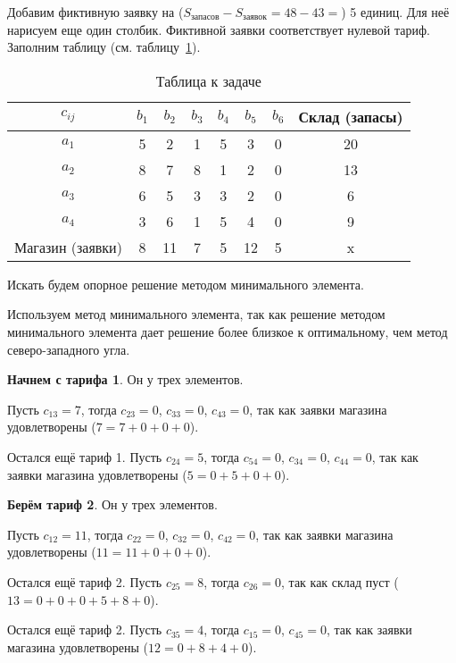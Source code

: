 Добавим фиктивную заявку на ($S_{\text{запасов}} - S_{\text{заявок}} = 48 - 43 = $) 5 единиц.
Для неё нарисуем еще один столбик.
Фиктивной заявки соответствует нулевой тариф.
Заполним таблицу (см. таблицу~\ref{tab:2}).

\begin{table}[h!]
  \scriptsize

  \centering

  \caption{Таблица к задаче}
  \label{tab:2}

  \begin{tabular}{|c||c|c|c|c|c|c||c|} 
    \hline
    $c_{ij}$  &$b_1$ &$b_2$  &$b_3$  &$b_4$  &$b_5$ &$b_6$  &Склад (запасы) \\ \hline
    \hline
    $a_1$             &5  &2  &1  &5  &3  &0  &20 \\  \hline
    $a_2$             &8  &7  &8  &1  &2  &0  &13 \\  \hline
    $a_3$             &6  &5  &3  &3  &2  &0  &6  \\  \hline
    $a_4$             &3  &6  &1  &5  &4  &0  &9  \\  \hline
    \hline
    Магазин (заявки)  &8  &11 &7  &5  &12 &5  &x  \\  \hline
  \end{tabular}
\end{table}

Искать будем опорное решение методом минимального элемента.

Используем метод минимального элемента, так как решение методом минимального элемента дает решение более близкое к оптимальному,
чем метод северо-западного угла.

\textbf{Начнем с тарифа 1}. Он у трех элементов.

Пусть $c_{13} = 7$, тогда $c_{23}=0$, $c_{33}=0$, $c_{43}=0$, так как заявки магазина удовлетворены ($7=7+0+0+0$).

Остался ещё тариф 1. Пусть $c_{24}=5$, тогда $c_{54}=0$, $c_{34}=0$, $c_{44}=0$, так как заявки магазина удовлетворены ($5=0+5+0+0$).

\textbf{Берём тариф 2}. Он у трех элементов.

Пусть $c_{12}=11$, тогда $c_{22}=0$, $c_{32}=0$, $c_{42}=0$, так как заявки магазина удовлетворены ($11=11+0+0+0$).

Остался ещё тариф 2. Пусть $c_{25}=8$, тогда $c_{26}=0$, так как склад пуст ($13=0+0+0+5+8+0$).

Остался ещё тариф 2. Пусть $c_{35}=4$, тогда $c_{15}=0$, $c_{45}=0$, так как заявки магазина удовлетворены ($12=0+8+4+0$).

